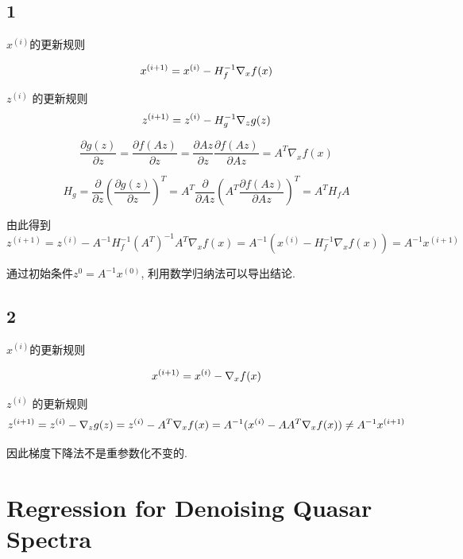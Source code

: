 \documentclass{ctexart}
\begin{document}
\subsection{1}

$x^{(i)}$的更新规则

\begin{equation}
	x^{(i+1)} = x^{(i)} - H_f^{-1} \nabla_x f(x) \notag
\end{equation}

$z^{(i)}$ 的更新规则
\begin{equation}
	z^{(i+1)} = z^{(i)} - H_g^{-1} \nabla_z g(z)	\notag
\end{equation}

\begin{equation}
	\frac{\partial g(z)}{\partial z} = \frac{\partial f(Az)}{\partial z} = \frac{\partial Az}{\partial z} \frac{\partial f(Az)}{\partial Az} = A^T \nabla_x f(x)
\end{equation}

\begin{equation}
	H_g = \frac{\partial}{\partial z}(\frac{\partial g(z)}{\partial z})^T = A^T \frac{\partial}{\partial Az}(A^T \frac{\partial f(Az)}{\partial Az})^T = A^T H_f A
\end{equation}

由此得到
\begin{equation}
	z^{(i+1)} = z^{(i)} - A^{-1}H_f^{-1}(A^T)^{-1}A^T\nabla_xf(x) = A^{-1}(x^{(i)} - H_f^{-1}\nabla_xf(x)) = A^{-1}x^{(i+1)}
\end{equation}

通过初始条件$z^{0} = A^{-1} x^{(0)}$, 利用数学归纳法可以导出结论.

\subsection{2}
$x^{(i)}$的更新规则

\begin{equation}
x^{(i+1)} = x^{(i)} -  \nabla_x f(x) \notag
\end{equation}

$z^{(i)}$ 的更新规则
\begin{equation}
z^{(i+1)} = z^{(i)} - \nabla_z g(z) = z^{(i)} - A^T\nabla_x f(x) = A^{-1}(x^{(i)} - AA^T\nabla_x f(x))	\ne A^{-1}x^{(i+1)}\notag
\end{equation}

因此梯度下降法不是重参数化不变的.

\section{Regression for Denoising Quasar Spectra}
\end{document}
